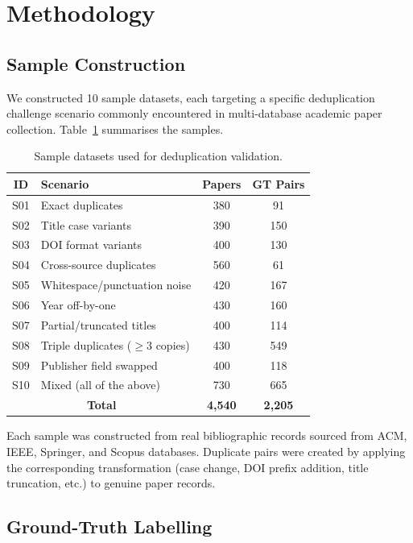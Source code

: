 \documentclass[conference]{IEEEtran}
\begin{document}
\section{Methodology}

\subsection{Sample Construction}

We constructed 10 sample datasets, each targeting a specific deduplication challenge scenario commonly encountered in multi-database academic paper collection. Table~\ref{tab:samples} summarises the samples.

\begin{table}[htbp]
\centering
\caption{Sample datasets used for deduplication validation.}
\label{tab:samples}
\begin{tabular}{@{}clcc@{}}
\toprule
\textbf{ID} & \textbf{Scenario} & \textbf{Papers} & \textbf{GT Pairs} \\
\midrule
S01 & Exact duplicates & 380 & 91 \\
S02 & Title case variants & 390 & 150 \\
S03 & DOI format variants & 400 & 130 \\
S04 & Cross-source duplicates & 560 & 61 \\
S05 & Whitespace/punctuation noise & 420 & 167 \\
S06 & Year off-by-one & 430 & 160 \\
S07 & Partial/truncated titles & 400 & 114 \\
S08 & Triple duplicates ($\geq$3 copies) & 430 & 549 \\
S09 & Publisher field swapped & 400 & 118 \\
S10 & Mixed (all of the above) & 730 & 665 \\
\midrule
\multicolumn{2}{c}{\textbf{Total}} & \textbf{4{,}540} & \textbf{2{,}205} \\
\bottomrule
\end{tabular}
\end{table}

Each sample was constructed from real bibliographic records sourced from ACM, IEEE, Springer, and Scopus databases. Duplicate pairs were created by applying the corresponding transformation (case change, DOI prefix addition, title truncation, etc.) to genuine paper records.

\subsection{Ground-Truth Labelling}
\end{document}
